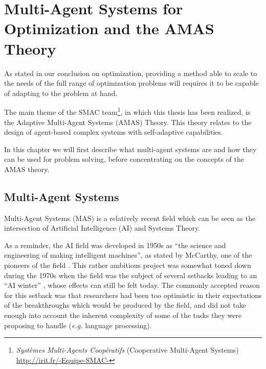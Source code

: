 \chapter{Multi-Agent Systems for Optimization and the AMAS Theory}\label{AMAS_chapter}

As stated in our conclusion on optimization, providing a method able to scale to the needs of the full range of optimization problems will requires it to be capable of adapting to the problem at hand.

The main theme of the SMAC team\footnote{\emph{Systèmes Multi-Agents Coopératifs} (Cooperative Multi-Agent Systems)\\\url{http://irit.fr/-Equipe-SMAC-}}, in which this thesis has been realized, is the Adaptive Multi-Agent Systems (AMAS) Theory. This theory relates to the design of agent-based complex systems with self-adaptive capabilities.

In this chapter we will first describe what multi-agent systems are and how they can be used for problem solving, before concentrating on the concepts of the AMAS theory.

\section{Multi-Agent Systems}

Multi-Agent Systems (MAS) is a relatively recent field which can be seen as the intersection of Artificial Intelligence (AI) and Systems Theory.


As a reminder, the AI field was developed in 1950s as \enquote{the science and engineering of making intelligent machines}, as stated by McCarthy, one of the pioneers of the field \cite{mccarthy2006proposal}. This rather ambitious project was somewhat toned down during the 1970s when the field was the subject of several setbacks leading to an \enquote{AI winter} \cite{10.1109/MIS.2008.20}, whose effects can still be felt today. The commonly accepted reason for this setback was that researchers had been too optimistic in their expectations of the breakthroughs which would be produced by the field, and did not take enough into account the inherent complexity of some of the tasks they were proposing to handle (\emph{e.g.} language processing).

